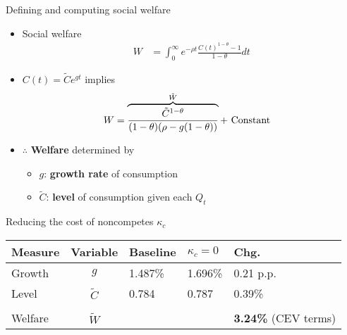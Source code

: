\documentclass[english,usenames,dvipsnames]{beamer}
\begin{document}
\begin{frame}{Defining and computing social welfare}\label{welfare}
	\begin{itemize}
		\item Social welfare
		\begin{align*}
			W &= \int_0^{\infty} e^{-\rho t} \frac{C(t)^{1-\theta} - 1}{1-\theta} dt
		\end{align*}
		\smallskip
		\item $C(t) = \tilde{C} e^{gt}$ implies
		\begin{align*}
			W &= \overbrace{\frac{\tilde{C}^{1-\theta}}{(1-\theta)(\rho - g(1-\theta))}}^{\mathclap{\tilde{W}}} + \text{ Constant} 
		\end{align*}
		\smallskip
		\item $\therefore$ \alert{\textbf{Welfare}} determined by
		\begin{itemize}
			\item $g$: \alert{\textbf{growth rate}} of consumption 
			\item $\tilde{C}$: \alert{\textbf{level}} of consumption given each $Q_t$ 
		\end{itemize}
	\end{itemize}
\end{frame}

\begin{frame}{Reducing the cost of noncompetes $\kappa_c$}\label{reducing_kappa_c_table}
	\begin{table}
		\centering
		\small
		\begin{tabular}{lclll}
			\toprule \toprule
			Measure & Variable & Baseline & $\kappa_c = 0$ & Chg. \tabularnewline
			\midrule
			Growth & $g$ & 1.487\% & 1.696\% & 0.21 p.p. \tabularnewline
			Level & $\tilde{C}$  & 0.784 &  0.787 & 0.39\% \tabularnewline 
			\tabularnewline
			Welfare & $\tilde{W}$  &  & & \alert{\textbf{3.24\%}} (CEV terms)  \tabularnewline
			\bottomrule
		\end{tabular}
	\end{table}
	\hyperlink{plots:reducing_kappa_c1}{}
	\hyperlink{plots:reducing_kappa_c2}{}
	\hyperlink{robustness_to_moments}{} \hyperlink{robustness_to_parameters}{}
	\hyperlink{reducing_kappa_c_table:entry_costs_as_transfers}{}
	\hyperlink{reducing_kappa_c_table:incumbentDRS}{}
	\hyperlink{efficiency}{}
\end{frame}
\end{document}
